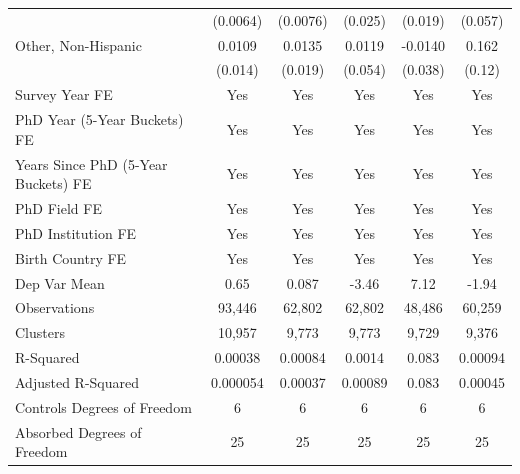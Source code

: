 \begin{table}[htbp]
\begin{tabular}{l*{5}{c}}
  &    (0.0064)         &    (0.0076)         &     (0.025)         &     (0.019)         &     (0.057)         \\
[1em]
Other, Non-Hispanic&      0.0109         &      0.0135         &      0.0119         &     -0.0140         &       0.162         \\
  &     (0.014)         &     (0.019)         &     (0.054)         &     (0.038)         &      (0.12)         \\
[1em]
Survey Year FE&         Yes         &         Yes         &         Yes         &         Yes         &         Yes         \\
[1em]
PhD Year (5-Year Buckets) FE&         Yes         &         Yes         &         Yes         &         Yes         &         Yes         \\
[1em]
Years Since PhD (5-Year Buckets) FE&         Yes         &         Yes         &         Yes         &         Yes         &         Yes         \\
[1em]
PhD Field FE&         Yes         &         Yes         &         Yes         &         Yes         &         Yes         \\
[1em]
PhD Institution FE&         Yes         &         Yes         &         Yes         &         Yes         &         Yes         \\
[1em]
Birth Country FE&         Yes         &         Yes         &         Yes         &         Yes         &         Yes         \\
\hline
Dep Var Mean&        0.65         &       0.087         &       -3.46         &        7.12         &       -1.94         \\
Observations&      93,446         &      62,802         &      62,802         &      48,486         &      60,259         \\
Clusters&      10,957         &       9,773         &       9,773         &       9,729         &       9,376         \\
R-Squared&     0.00038         &     0.00084         &      0.0014         &       0.083         &     0.00094         \\
Adjusted R-Squared&    0.000054         &     0.00037         &     0.00089         &       0.083         &     0.00045         \\
Controls Degrees of Freedom&           6         &           6         &           6         &           6         &           6         \\
Absorbed Degrees of Freedom&          25         &          25         &          25         &          25         &          25         \\

\end{tabular}
\end{table}
